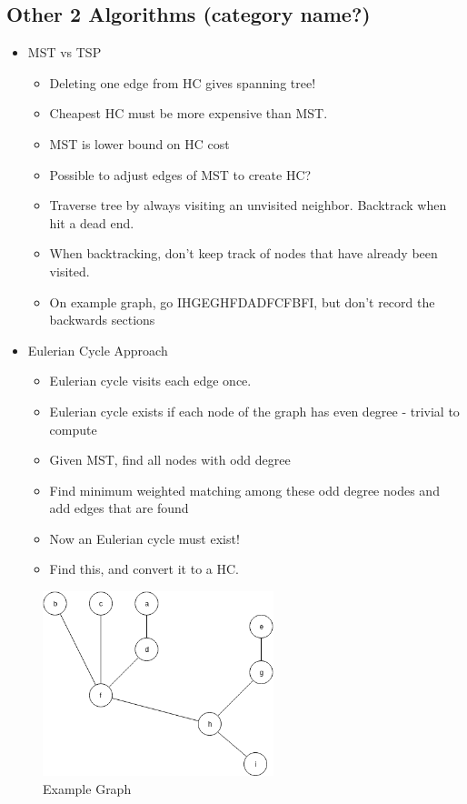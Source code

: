 \documentclass[12pt, letter]{article}
\begin{document}
\subsection*{Other 2 Algorithms (category name?)}
\begin{itemize}
    \item MST vs TSP
    \begin{itemize}
        \item Deleting one edge from HC gives spanning tree!
        \item Cheapest HC must be more expensive than MST.
        \item MST is lower bound on HC cost
        \item Possible to adjust edges of MST to create HC?
        \item Traverse tree by always visiting an unvisited neighbor. Backtrack when hit a dead end.
        \item When backtracking, don't keep track of nodes that have already been visited.
        \item On example graph, go IHGEGHFDADFCFBFI, but don't record the backwards sections
    \end{itemize}
    \item Eulerian Cycle Approach
    \begin{itemize}
        \item Eulerian cycle visits each edge once.
        \item Eulerian cycle exists if each node of the graph has even degree - trivial to compute
        \item Given MST, find all nodes with odd degree
        \item Find minimum weighted matching among these odd degree nodes and add edges that are found
        \item Now an Eulerian cycle must exist!
        \item Find this, and convert it to a HC.
    \end{itemize}
\end{itemize}

\begin{figure}[h]
    \centering
    \includegraphics[width=0.6\textwidth]{exgraph}
    \caption{Example Graph}
    \label{fig:exgraph}
\end{figure}
\end{document}
